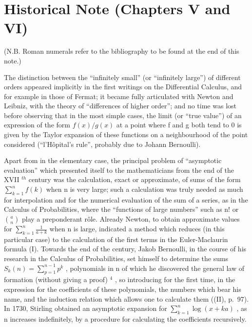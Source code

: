 \section*{Historical Note (Chapters V and VI)}
{}

(N.B. Roman numerals refer to the bibliography to be found at the end of this note.)

The distinction between the ``infinitely small'' (or ``infinitely large'') of different orders appeared implicitly in the first writings on the Differential Calculus, and for example in those of Fermat; it became fully articulated with Newton and Leibniz, with the theory of ``differences of higher order''; and no time was lost before observing that in the most simple cases, the limit (or ``true value'') of an expression of the form \(f(x)/g(x)\) at a point where f and g both tend to 0 is given by the Taylor expansion of these functions on a neighbourhood of the point considered (``l'Hôpital's rule'', probably due to Johann Bernoulli).

Apart from in the elementary case, the principal problem of ``asymptotic evaluation'' which presented itself to the mathematicians from the end of the XVII \(^{th}\) century was the calculation, exact or approximate, of sums of the form \(\sum_{k=1}^{n} f(k)\) when n is very large; such a calculation was truly needed as much for interpolation and for the numerical evaluation of the sum of a series, as in the Calculus of Probabilities, where the ``functions of large numbers'' such as n! or \(\binom{a}{n}\) play a preponderant rôle. Already Newton, to obtain approximate values for \(\sum_{k=1}^{n} \frac{1}{a+k}\) when n is large, indicated a method which reduces (in this particular case) to the calculation of the first terms in the Euler-Maclaurin formula (I). Towards the end of the century, Jakob Bernoulli, in the course of his research in the Calculus of Probabilities, set himself to determine the sums \(S_{k}(n) = \sum_{p=1}^{n-1} p^{k}\) , polynomials in n of which he discovered the general law of formation (without giving a proof) \(^{4}\) , so introducing for the first time, in the expression for the coefficients of these polynomials, the numbers which bear his name, and the induction relation which allows one to calculate them ((II), p.~97). In 1730, Stirling obtained an asymptotic expansion for \(\sum_{k=1}^{n} \log(x + ka)\) , as n increases indefinitely, by a procedure for calculating the coefficients recursively.

